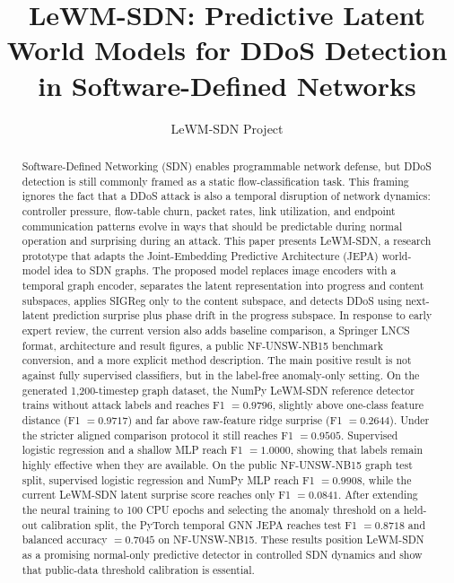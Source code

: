 \documentclass[runningheads]{llncs}
\begin{document}
\title{LeWM-SDN: Predictive Latent World Models for DDoS Detection in Software-Defined Networks}

\author{LeWM-SDN Project}

\maketitle
\setcounter{page}{1}
\pagestyle{plain}
\thispagestyle{plain}

\begin{abstract}
Software-Defined Networking (SDN) enables programmable network defense, but
DDoS detection is still commonly framed as a static flow-classification task.
This framing ignores the fact that a DDoS attack is also a temporal disruption
of network dynamics: controller pressure, flow-table churn, packet rates, link
utilization, and endpoint communication patterns evolve in ways that should be
predictable during normal operation and surprising during an attack. This paper
presents LeWM-SDN, a research prototype that adapts the Joint-Embedding
Predictive Architecture (JEPA) world-model idea to SDN graphs. The proposed
model replaces image encoders with a temporal graph encoder, separates the
latent representation into progress and content subspaces, applies SIGReg only
to the content subspace, and detects DDoS using next-latent prediction surprise
plus phase drift in the progress subspace. In response to early expert review,
the current version also adds baseline comparison, a Springer LNCS format,
architecture and result figures, a public NF-UNSW-NB15 benchmark conversion,
and a more explicit method description. The main positive result is not against
fully supervised classifiers, but in the label-free anomaly-only setting. On
the generated 1,200-timestep graph dataset, the NumPy LeWM-SDN reference
detector trains without attack labels and reaches F1 $=0.9796$, slightly above
one-class feature distance (F1 $=0.9717$) and far above raw-feature ridge
surprise (F1 $=0.2644$). Under the stricter aligned comparison protocol it
still reaches F1 $=0.9505$. Supervised logistic regression and a shallow MLP
reach F1 $=1.0000$, showing that labels remain highly effective when they are
available. On the public NF-UNSW-NB15 graph test split, supervised logistic
regression and NumPy MLP reach F1 $=0.9908$, while the current LeWM-SDN latent
surprise score reaches only F1 $=0.0841$. After extending the neural training
to 100 CPU epochs and selecting the anomaly threshold on a held-out calibration
split, the PyTorch temporal GNN JEPA reaches test F1 $=0.8718$ and balanced
accuracy $=0.7045$ on NF-UNSW-NB15. These results position LeWM-SDN as a
promising normal-only predictive detector in controlled SDN dynamics and show
that public-data threshold calibration is essential.

\end{abstract}
\end{document}

